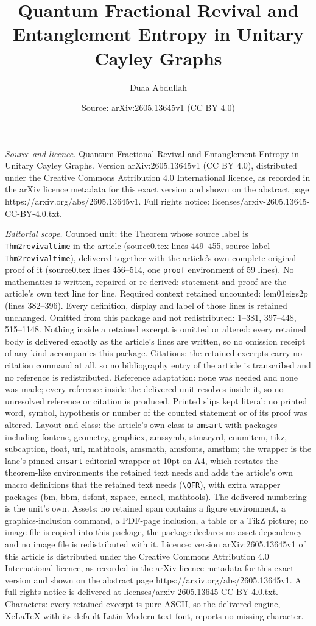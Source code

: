 \documentclass[10pt,a4paper]{amsart}
\title[Quantum Fractional Revival and Entanglement Entropy in Unita]{Quantum Fractional Revival and Entanglement Entropy in Unitary Cayley Graphs}
\author{Duaa Abdullah}
\date{Source: arXiv:2605.13645v1 (CC BY 4.0)}
\begin{document}
\maketitle

\noindent\emph{Source and licence.} Quantum Fractional Revival and Entanglement Entropy in Unitary Cayley Graphs. Version arXiv:2605.13645v1 (CC BY 4.0), distributed under the Creative Commons Attribution 4.0 International licence, as recorded in the arXiv licence metadata for this exact version and shown on the abstract page https://arxiv.org/abs/2605.13645v1. Full rights notice: licenses/arxiv-2605.13645-CC-BY-4.0.txt.\par\smallskip

\noindent\textit{Editorial scope.} Counted unit: the Theorem whose source label is \texttt{Thm2revivaltime} in the article (source0.tex lines 449--455, source label \texttt{Thm2revivaltime}), delivered together with the article's own complete original proof of it (source0.tex lines 456--514, one \texttt{proof} environment of 59 lines). No mathematics is written, repaired or re-derived: statement and proof are the article's own text line for line. Required context retained uncounted: lem01eigs2p (lines 382--396). Every definition, display and label of those lines is retained unchanged. Omitted from this package and not redistributed: 1--381, 397--448, 515--1148. Nothing inside a retained excerpt is omitted or altered: every retained body is delivered exactly as the article's lines are written, so no omission receipt of any kind accompanies this package. Citations: the retained excerpts carry no citation command at all, so no bibliography entry of the article is transcribed and no reference is redistributed. Reference adaptation: none was needed and none was made; every reference inside the delivered unit resolves inside it, so no unresolved reference or citation is produced. Printed slips kept literal: no printed word, symbol, hypothesis or number of the counted statement or of its proof was altered. Layout and class: the article's own class is \texttt{amsart} with packages including fontenc, geometry, graphicx, amssymb, stmaryrd, enumitem, tikz, subcaption, float, url, mathtools, amsmath, amsfonts, amsthm; the wrapper is the lane's pinned \texttt{amsart} editorial wrapper at 10pt on A4, which restates the theorem-like environments the retained text needs and adds the article's own macro definitions that the retained text needs (\texttt{\textbackslash QFR}), with extra wrapper packages (bm, bbm, dsfont, xspace, cancel, mathtools). The delivered numbering is the unit's own. Assets: no retained span contains a figure environment, a graphics-inclusion command, a PDF-page inclusion, a table or a TikZ picture; no image file is copied into this package, the package declares no asset dependency and no image file is redistributed with it. Licence: version arXiv:2605.13645v1 of this article is distributed under the Creative Commons Attribution 4.0 International licence, as recorded in the arXiv licence metadata for this exact version and shown on the abstract page https://arxiv.org/abs/2605.13645v1. A full rights notice is delivered at licenses/arxiv-2605.13645-CC-BY-4.0.txt. Characters: every retained excerpt is pure ASCII, so the delivered engine, XeLaTeX with its default Latin Modern text font, reports no missing character.
\end{document}
